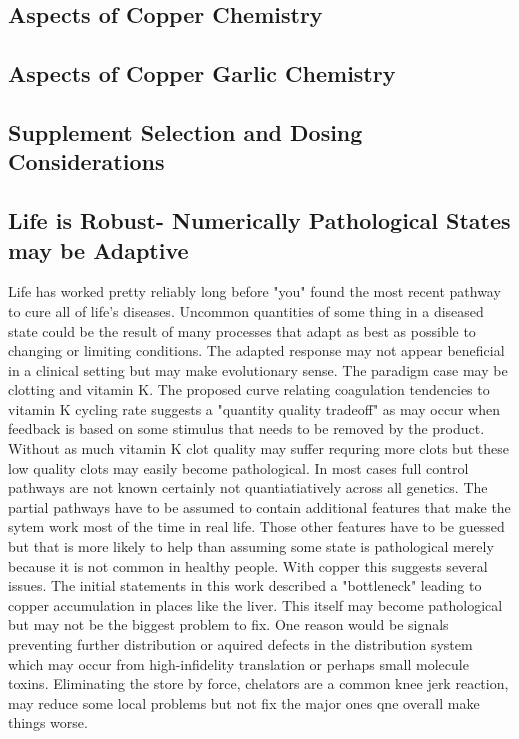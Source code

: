\subsection{Aspects of Copper Chemistry  }

\subsection{Aspects of Copper Garlic  Chemistry  }


\subsection{Supplement Selection and Dosing Considerations  }


\subsection{Life is Robust- Numerically Pathological States may be Adaptive }
Life has worked pretty reliably long before "you" found the
most recent pathway to cure all of life's diseases.
Uncommon quantities of some thing in a diseased state could be the
result of many processes that adapt as best as possible to changing
or limiting conditions. The adapted response may not appear beneficial
in a clinical setting but may make evolutionary sense. 
The paradigm case may be clotting and vitamin K. The proposed
curve relating coagulation tendencies to vitamin K cycling rate
suggests a "quantity quality tradeoff" as may occur when feedback
is based on some stimulus that needs to be removed by the product.
Without as much vitamin K clot quality may suffer requring 
more clots but these low quality clots may easily become pathological.
In most cases full control pathways are not known certainly
not quantiatiatively across all genetics. The partial pathways
have to be assumed to contain additional features
that make the sytem work most of the time in real life.
Those other features have to be guessed but that is more likely
to help than assuming some state is pathological merely
because it is not common in healthy people.
With copper this suggests several issues. The initial statements
in this work described a "bottleneck" leading
to copper accumulation in places like the liver. This itself
may become pathological but may not be the biggest problem
to fix. One reason would be signals preventing further distribution
or aquired defects in the distribution system which may occur 
from high-infidelity translation or perhaps small molecule toxins.  
Eliminating the store by force, chelators are a common knee
jerk reaction,  may reduce some local problems but not fix the
major ones qne overall make things worse. 



